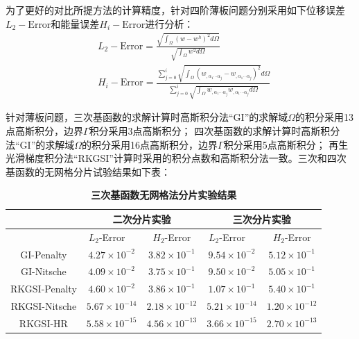 为了更好的对比所提方法的计算精度，针对四阶薄板问题分别采用如下位移误差$L_2-\text{Error}$和能量误差$H_i-\text{Error}$进行分析：
\begin{equation}
\begin{split}
    &L_2-\text{Error}=\frac{\sqrt{\int_{\Omega}(w-w^h)^2d\Omega}}{\sqrt{\int_{\Omega}w^2d\Omega}}\\
    &H_i-\text{Error}=\frac{\sum_{j=0}^{i}\sqrt{\int_{\Omega}(w_{,\alpha_1\dotsb \alpha_j}-w_{,\alpha_1\dotsb \alpha_j})^2}d\Omega}{\sum_{j=0}^{i}\sqrt{\int_{\Omega}w_{,\alpha_1\dotsb \alpha_j}w_{,\alpha_1\dotsb \alpha_j}d\Omega}}
\end{split}
\end{equation}\par
针对薄板问题，三次基函数的求解计算时高斯积分法“GI”的求解域$\Omega$的积分采用13点高斯积分，边界$\Gamma$积分采用3点高斯积分；
四次基函数的求解计算时高斯积分法“GI”的求解域$\Omega$的积分采用16点高斯积分，边界$\Gamma$积分采用5点高斯积分；
再生光滑梯度积分法“RKGSI”计算时采用的积分点数和高斯积分法一致。三次和四次基函数的无网格分片试验结果如下表：
\begin{table}[H]
    \caption{\textbf{三次基函数无网格法分片实验结果}}
    \centering\label{cubic}
   \begin{tabular}{ccccc}
   \toprule
    $\quad$&\multicolumn{2}{c}{二次分片实验}&\multicolumn{2}{c}{三次分片实验}\\
   \midrule
   &$L_2$-Error$\quad$&$H_2$-Error&$L_2$-Error$\quad$&$H_2$-Error\\
   \midrule
   GI-Penalty&$4.27\times10^{-2}$&$3.82\times10^{-1}$&$9.54\times10^{-2}$&$5.12\times10^{-1}$\\
   GI-Nitsche&$4.09\times10^{-2}$&$3.75\times10^{-1}$&$9.50\times10^{-2}$&$5.05\times10^{-1}$\\
  RKGSI-Penalty&$4.60\times10^{-2}$&$3.86\times10^{-1}$&$1.07\times10^{-1}$&$5.40\times10^{-1}$\\
  RKGSI-Nitsche&$5.67\times10^{-14}$&$2.18\times10^{-12}$&$5.21\times10^{-14}$&$1.20\times10^{-12}$\\
  RKGSI-HR&$5.58\times10^{-15}$&$4.56\times10^{-13}$&$3.66\times10^{-15}$&$2.70\times10^{-13}$\\
   \bottomrule
   \end{tabular}
   \end{table}
